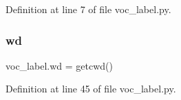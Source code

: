 Definition at line 7 of file voc\+\_\+label.\+py.

\mbox{\label{namespacevoc__label_aae3f517979bd13e02baba600c32fa954}} 
\subsubsection{\texorpdfstring{wd}{wd}}
{\footnotesize\ttfamily voc\+\_\+label.\+wd = getcwd()}



Definition at line 45 of file voc\+\_\+label.\+py.

